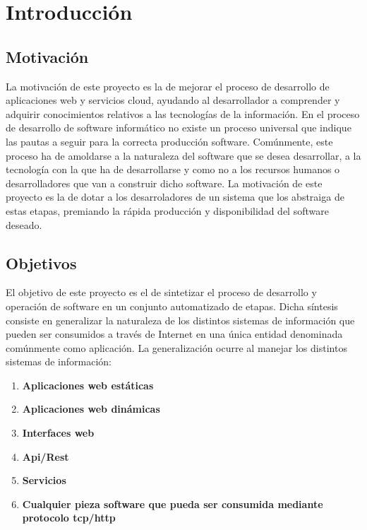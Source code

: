 \documentclass[a4paper,11pt]{book}
\begin{document}



\tableofcontents
\listoffigures

%

%



\chapter{Introducción}

\section{Motivación}

La motivación de este proyecto es la de mejorar el proceso de desarrollo de aplicaciones web y servicios cloud, ayudando al desarrollador a comprender y adquirir conocimientos relativos a las tecnologías de la información.  En el proceso de desarrollo de software informático no existe un proceso universal que indique las pautas a seguir para la correcta producción software. Comúnmente, este proceso ha de amoldarse a la naturaleza del software que se desea desarrollar, a la tecnología con la que ha de desarrollarse y como no a los recursos humanos o desarrolladores que van a construir dicho software. La motivación de este proyecto es la de dotar a los desarroladores de un sistema que los abstraiga de estas etapas, premiando la rápida producción y disponibilidad del software deseado. 

\section{Objetivos}

El objetivo de este proyecto es el de sintetizar el proceso de desarrollo y operación de software en un conjunto automatizado de etapas. Dicha síntesis consiste en generalizar la naturaleza de los distintos sistemas de información que pueden ser consumidos a través de Internet en una única entidad denominada comúnmente como aplicación. La generalización ocurre al manejar los distintos sistemas de información:

\begin{enumerate}
\item \textbf{ Aplicaciones web estáticas }  
\item \textbf{ Aplicaciones web dinámicas}
\item \textbf{ Interfaces web }  
\item \textbf{ Api/Rest }  
\item \textbf{ Servicios }  
\item \textbf{ Cualquier pieza software que pueda ser consumida mediante protocolo tcp/http }  
\end{enumerate}
\end{document}
